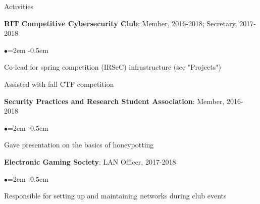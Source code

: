 \documentclass{resume} %
\begin{document}
\begin{rSection}{Activities}

    {\bf RIT Competitive Cybersecurity Club}: Member, 2016-2018; Secretary,
    2017-2018
    \begin{list}{$\bullet$}{\leftmargin=2em}
    \itemsep -0.5em \vspace{-0.5em}
    \item Co-lead for spring competition (IRSeC) infrastructure (see
        "Projects")
    \item Assisted with fall CTF competition
    \end{list}

    {\bf Security Practices and Research Student Association}: Member, 2016-
    2018
    \begin{list}{$\bullet$}{\leftmargin=2em}
    \itemsep -0.5em \vspace{-0.5em}
    \item Gave presentation on the basics of honeypotting
    \end{list}

    {\bf Electronic Gaming Society}: LAN Officer, 2017-2018
    \begin{list}{$\bullet$}{\leftmargin=2em}
    \itemsep -0.5em \vspace{-0.5em}
    \item Responsible for setting up and maintaining networks during club
        events
    \end{list}

\end{rSection}





\end{document}

